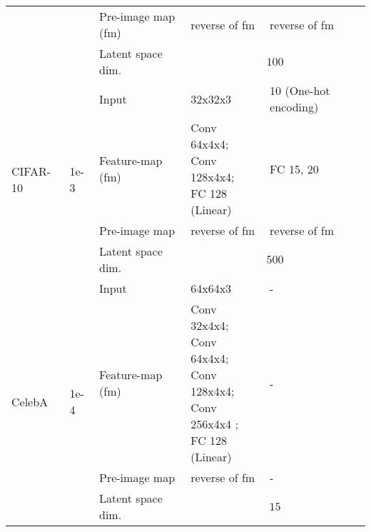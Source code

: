\documentclass[preview,border=0.3pt]{standalone}
\begin{document}
\begin{table}[H]
\begin{tabular}{l l l l l}
                                  &                            & Pre-image map (fm) & reverse of fm                             & reverse of fm                       \\
                                  &                            & Latent space dim.  & \multicolumn{2}{c}{$100$}                                                       \\
        \hline
        \multirow{4}{*}{CIFAR-10} & \multirow{4}{*}{1e-3}      & Input              & 32x32x3                                   & 10 (One-hot encoding)               \\
                                  &                            & Feature-map (fm)   & \pbox{20cm}{Conv 64x4x4;                                                        \\  Conv 128x4x4;\\ FC 128 (Linear)}                                   &             FC 15, 20                \\
                                  &                            & Pre-image map      & reverse of fm                             & reverse of fm                       \\
                                  &                            & Latent space dim.  & \multicolumn{2}{c}{$500$}                                                       \\
        \hline
        \multirow{4}{*}{CelebA}   & \multirow{4}{*}{1e-4}      & Input              & 64x64x3                                   & -                                   \\
                                  &                            & Feature-map (fm)   & \pbox{20cm}{Conv 32x4x4;                                                        \\ Conv 64x4x4;\\ Conv 128x4x4;\\Conv 256x4x4 ;\\ FC 128 (Linear)}                                          &            -                \\
                                  &                            & Pre-image map      & reverse of fm                             & -                                   \\
                                  &                            & Latent space dim.  & \multicolumn{2}{c}{$15$}                                                        \\

\end{tabular}
\end{table}
\end{document}

